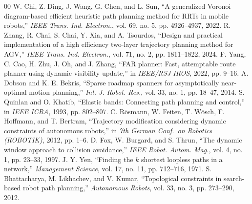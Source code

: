 \documentclass[conference]{IEEEtran}
\begin{document}
\begin{thebibliography}{00}
 W. Chi, Z. Ding, J. Wang, G. Chen, and L. Sun, ``A generalized Voronoi diagram-based efficient heuristic path planning method for RRTs in mobile robots,'' \textit{IEEE Trans. Ind. Electron.}, vol. 69, no. 5, pp. 4926--4937, 2022.
 R. Zhang, R. Chai, S. Chai, Y. Xia, and A. Tsourdos, ``Design and practical implementation of a high efficiency two-layer trajectory planning method for AGV,'' \textit{IEEE Trans. Ind. Electron.}, vol. 71, no. 2, pp. 1811--1822, 2024.
 F. Yang, C. Cao, H. Zhu, J. Oh, and J. Zhang, ``FAR planner: Fast, attemptable route planner using dynamic visibility update,'' in \textit{IEEE/RSJ IROS}, 2022, pp. 9--16.
 A. Dobson and K. E. Bekris, ``Sparse roadmap spanners for asymptotically near-optimal motion planning,'' \textit{Int. J. Robot. Res.}, vol. 33, no. 1, pp. 18--47, 2014.
 S. Quinlan and O. Khatib, ``Elastic bands: Connecting path planning and control,'' in \textit{IEEE ICRA}, 1993, pp. 802--807.
 C. R\"osmann, W. Feiten, T. W\"osch, F. Hoffmann, and T. Bertram, ``Trajectory modification considering dynamic constraints of autonomous robots,'' in \textit{7th German Conf.\ on Robotics (ROBOTIK)}, 2012, pp. 1--6.
 D. Fox, W. Burgard, and S. Thrun, ``The dynamic window approach to collision avoidance,'' \textit{IEEE Robot. Autom. Mag.}, vol. 4, no. 1, pp. 23--33, 1997.
 J. Y. Yen, ``Finding the $k$ shortest loopless paths in a network,'' \textit{Management Science}, vol. 17, no. 11, pp. 712--716, 1971.
 S. Bhattacharya, M. Likhachev, and V. Kumar, ``Topological constraints in search-based robot path planning,'' \textit{Autonomous Robots}, vol. 33, no. 3, pp. 273--290, 2012.
\end{thebibliography}
\end{document}
